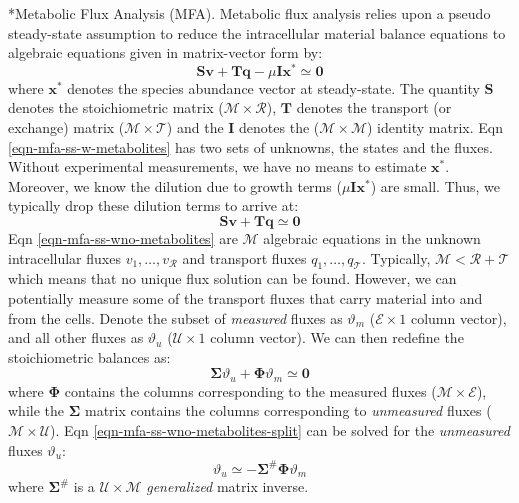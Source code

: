 \documentclass[11pt]{article}
\makeatletter
\theoremstyle{definition}
\renewcommand\subsection{\@startsection
	{subsection}{2}{0mm}
	{-0.05in}
	{-0.5\baselineskip}
	{\normalfont\normalsize\bfseries}}
\makeatother
\begin{document}
\subsection*{Metabolic Flux Analysis (MFA).}
Metabolic flux analysis relies upon a pseudo steady-state assumption to reduce the intracellular material balance equations to algebraic equations given in matrix-vector form by:
\begin{equation}\label{eqn-mfa-ss-w-metabolites}
	\mathbf{S}\mathbf{v} + \mathbf{T}\mathbf{q} -\mu\mathbf{I}\mathbf{x}^{*}\simeq\mathbf{0}
\end{equation}where $\mathbf{x}^{*}$ denotes the species abundance vector at steady-state.
The quantity $\mathbf{S}$ denotes the stoichiometric matrix ($\mathcal{M}\times{\mathcal{R}}$),
$\mathbf{T}$ denotes the transport (or exchange) matrix ($\mathcal{M}\times{\mathcal{T}}$) and the $\mathbf{I}$ denotes the ($\mathcal{M}\times{\mathcal{M}}$) identity matrix.
Eqn \eqref{eqn-mfa-ss-w-metabolites} has two sets of unknowns, the states and the fluxes. Without experimental measurements, we have no means to estimate $\mathbf{x}^{*}$.
Moreover, we know the dilution due to growth terms ($\mu\mathbf{I}\mathbf{x}^{*}$) are small.
Thus, we typically drop these dilution terms to arrive at:
\begin{equation}\label{eqn-mfa-ss-wno-metabolites}
	\mathbf{S}\mathbf{v} + \mathbf{T}\mathbf{q} \simeq\mathbf{0}
\end{equation}Eqn \eqref{eqn-mfa-ss-wno-metabolites} are $\mathcal{M}$ algebraic equations in the unknown intracellular fluxes $v_{1},\hdots,v_{\mathcal{R}}$ and transport fluxes
$q_{1},\hdots,q_{\mathcal{T}}$. Typically, $\mathcal{M}<\mathcal{R}+\mathcal{T}$ which means that no unique flux solution can be found.
However, we can potentially measure some of the transport fluxes that carry material into and from the cells. Denote the subset of \emph{measured} fluxes
as $\vartheta_{m}$ ($\mathcal{E}\times{1}$ column vector), and all other fluxes as $\vartheta_{u}$ ($\mathcal{U}\times{1}$ column vector).
We can then redefine the stoichiometric balances as:
\begin{equation}\label{eqn-mfa-ss-wno-metabolites-split}
	\mathbf{\Sigma}\vartheta_{u} + \mathbf{\Phi}\vartheta_{m} \simeq\mathbf{0}
\end{equation}where $\mathbf{\Phi}$ contains the columns corresponding to the measured fluxes ($\mathcal{M}\times\mathcal{E}$), while the $\mathbf{\Sigma}$ matrix contains
the columns corresponding to \emph{unmeasured} fluxes ($\mathcal{M}\times\mathcal{U}$).
Eqn \eqref{eqn-mfa-ss-wno-metabolites-split} can be solved for the \emph{unmeasured} fluxes $\vartheta_{u}$:
\begin{equation}
	\vartheta_{u}\simeq-\mathbf{\Sigma}^{\#}\mathbf{\Phi}\vartheta_{m}
\end{equation}where $\mathbf{\Sigma}^{\#}$ is a $\mathcal{U}\times\mathcal{M}$ \emph{generalized} matrix inverse.
\end{document}
